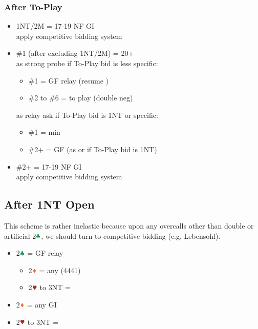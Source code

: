 \documentclass{article}
\begin{document}
\begin{multicols}{2}
\subsubsection{After To-Play}
\begin{itemize}
    \item 1NT/2M = 17-19 NF GI \\
        apply competitive bidding system
    \item \#1 (after excluding 1NT/2M) = 20+ \\
        as strong probe if To-Play bid is less specific:
        \begin{itemize}
            \item \#1 = GF relay (resume )
            \item \#2 to \#6 = to play (double neg)
        \end{itemize}
        as relay ask if To-Play bid is 1NT or specific:
        \begin{itemize}
            \item \#1 = min
            \item \#2+ = GF (as  or
                 if To-Play bid is 1NT)
        \end{itemize}
    \item \#2+ = 17-19 NF GI \\
        apply competitive bidding system
\end{itemize}

\subsection{After 1NT Open}\label{sec:1n}
This scheme is rather inelastic because upon any overcalls other than double or artificial 2$\ccc$, we should turn to competitive bidding (e.g. Lebensohl).

\begin{itemize}
    \item 2$\ccc$ = GF relay
    \begin{itemize}
        \item 2$\ddd$ = any (4441)
        \item 2$\hhh$ to 3NT = 
    \end{itemize}
    \item 2$\ddd$ = any GI
    \item 2$\hhh$ to 3NT = 
\end{itemize}


\end{multicols}
\end{document}
